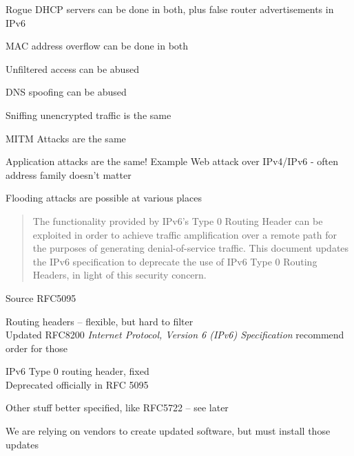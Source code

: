 \documentclass[Screen16to9,17pt]{foils}
\begin{document}


\begin{list2}
\item Rogue DHCP servers can be done in both, plus false router advertisements in IPv6
\item MAC address overflow can be done in both
\item Unfiltered access can be abused
\item DNS spoofing can be abused
\item Sniffing unencrypted traffic is the same
\item MITM Attacks are the same {\myalert}
\item Application attacks are the same! Example Web attack over IPv4/IPv6 - often address family doesn't matter {\myalert}
\item Flooding attacks are possible at various places
\end{list2}



\begin{quote}
The functionality provided by IPv6's Type 0 Routing Header can be exploited in order to achieve traffic amplification over a remote path for the purposes of generating denial-of-service traffic.  This document updates the IPv6 specification to deprecate the use of IPv6 Type 0 Routing Headers, in light of this security concern.
\end{quote}
Source RFC5095


\begin{list2}
\item Routing headers -- flexible, but hard to filter\\
Updated RFC8200 \emph{Internet Protocol, Version 6 (IPv6) Specification} recommend order for those
\item IPv6 Type 0 routing header, fixed\\
Deprecated officially in RFC 5095 
\item Other stuff better specified, like RFC5722 -- see later
\end{list2}

We are relying on vendors to create updated software, but must install those updates


\end{document}
